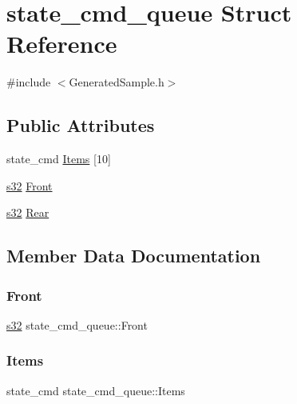 \hypertarget{structstate__cmd__queue}{}\section{state\+\_\+cmd\+\_\+queue Struct Reference}
\label{structstate__cmd__queue}


{\ttfamily \#include $<$Generated\+Sample.\+h$>$}

\subsection*{Public Attributes}
\begin{DoxyCompactItemize}
\item 
state\+\_\+cmd \hyperlink{structstate__cmd__queue_ad2f3220b40d00bfd18621494486b77d2}{Items} \mbox{[}10\mbox{]}
\item 
\hyperlink{ab__common_8h_ae9b1af5c037e57a98884758875d3a7c4}{s32} \hyperlink{structstate__cmd__queue_a55c5a533874f46869f1b0c472dd70a7e}{Front}
\item 
\hyperlink{ab__common_8h_ae9b1af5c037e57a98884758875d3a7c4}{s32} \hyperlink{structstate__cmd__queue_af93455ef4f59c05176a6bd70b07a1f10}{Rear}
\end{DoxyCompactItemize}


\subsection{Member Data Documentation}
\mbox{\label{structstate__cmd__queue_a55c5a533874f46869f1b0c472dd70a7e}} 
\subsubsection{\texorpdfstring{Front}{Front}}
{\footnotesize\ttfamily \hyperlink{ab__common_8h_ae9b1af5c037e57a98884758875d3a7c4}{s32} state\+\_\+cmd\+\_\+queue\+::\+Front}

\mbox{\label{structstate__cmd__queue_ad2f3220b40d00bfd18621494486b77d2}} 
\subsubsection{\texorpdfstring{Items}{Items}}
{\footnotesize\ttfamily state\+\_\+cmd state\+\_\+cmd\+\_\+queue\+::\+Items}

